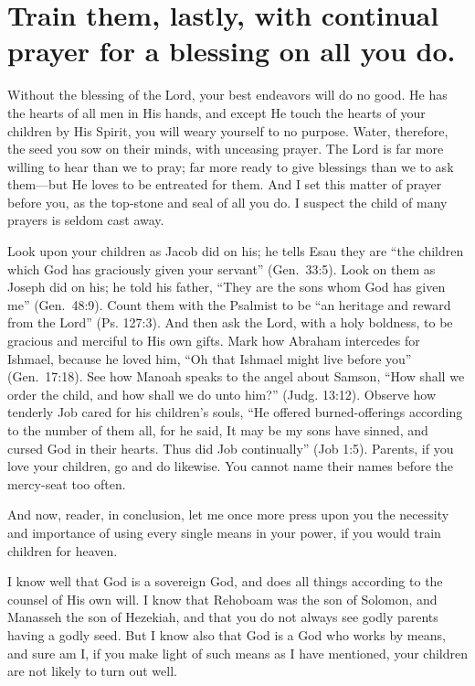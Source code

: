 \documentclass[
]{book}
\begin{document}
\hypertarget{train-them-lastly-with-continual-prayer-for-a-blessing-on-all-you-do.}{%
\chapter{Train them, lastly, with continual prayer for a blessing on all you do.}\label{train-them-lastly-with-continual-prayer-for-a-blessing-on-all-you-do.}}

Without the blessing of the Lord, your best endeavors will do no good. He has the hearts of all men in His hands, and except He touch the hearts of your children by His Spirit, you will weary yourself to no purpose. Water, therefore, the seed you sow on their minds, with unceasing prayer. The Lord is far more willing to hear than we to pray; far more ready to give blessings than we to ask them---but He loves to be entreated for them. And I set this matter of prayer before you, as the top-stone and seal of all you do. I suspect the child of many prayers is seldom cast away.

Look upon your children as Jacob did on his; he tells Esau they are ``the children which God has graciously given your servant'' (Gen.~33:5). Look on them as Joseph did on his; he told his father, ``They are the sons whom God has given me'' (Gen.~48:9). Count them with the Psalmist to be ``an heritage and reward from the Lord'' (Ps. 127:3). And then ask the Lord, with a holy boldness, to be gracious and merciful to His own gifts. Mark how Abraham intercedes for Ishmael, because he loved him, ``Oh that Ishmael might live before you'' (Gen.~17:18). See how Manoah speaks to the angel about Samson, ``How shall we order the child, and how shall we do unto him?'' (Judg. 13:12). Observe how tenderly Job cared for his children's souls, ``He offered burned-offerings according to the number of them all, for he said, It may be my sons have sinned, and cursed God in their hearts. Thus did Job continually'' (Job 1:5). Parents, if you love your children, go and do likewise. You cannot name their names before the mercy-seat too often.

And now, reader, in conclusion, let me once more press upon you the necessity and importance of using every single means in your power, if you would train children for heaven.

I know well that God is a sovereign God, and does all things according to the counsel of His own will. I know that Rehoboam was the son of Solomon, and Manasseh the son of Hezekiah, and that you do not always see godly parents having a godly seed. But I know also that God is a God who works by means, and sure am I, if you make light of such means as I have mentioned, your children are not likely to turn out well.
\end{document}
